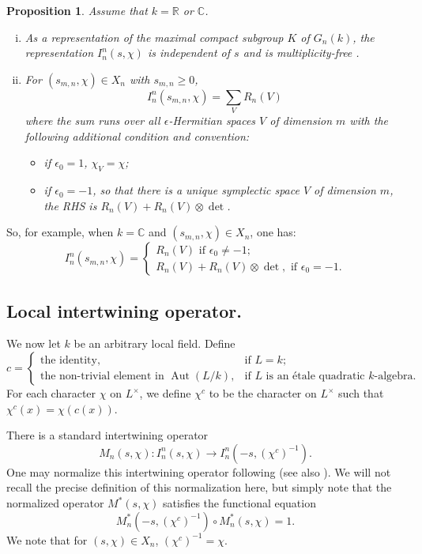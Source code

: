 \documentclass[10pt]{amsart}
\theoremstyle{plain}
\newtheorem{Prop}[equation]{Proposition}
\numberwithin{equation}{section}
\begin{document}
\begin{Prop} \label{P:arch1}
Assume that $k = {\mathbb{R}}$ or ${\mathbb C}$.
\begin{enumerate}[(i)]
\item As a representation of the maximal compact subgroup $K$ of
  $G_n(k)$, the representation $I^n_n(s,\chi)$ is independent of $s$
  and is multiplicity-free  .
\item For $(s_{m,n},\chi) \in X_n$ with $s_{m,n} \geq 0$, 
\[  I^n_n(s_{m,n}, \chi)  = \sum_V  R_n(V) \]
where the sum runs over all $\epsilon$-Hermitian spaces $V$ of
dimension $m$ with the following additional condition and  convention:
\begin{itemize}
 \item if $\epsilon_0 = 1$, $\chi_V = \chi$;
\item if $\epsilon_0 = -1$, so that there is a unique symplectic space
  $V$ of dimension $m$, the RHS is $R_n(V) + R_n(V) \otimes {\det}$. 
\end{itemize}
 \end{enumerate}
\end{Prop}
 So, for example, when $k = {\mathbb C}$ and $(s_{m,n}, \chi) \in X_n$, one has:
\[ 
 I^n_n(s_{m,n}, \chi)  = \begin{cases}
R_n(V) \text{  if $\epsilon_ 0 \ne -1$;} \\
R_n(V) + R_n(V) \otimes {\det}, \text{  if $\epsilon_0 =
  -1$.} \end{cases} 
\] 
 
 \vskip 5pt
 
  \subsection{\bf Local intertwining operator.}
 We now let $k$ be an arbitrary local field. Define 
\[
c=\begin{cases} \text{the identity},&\text{if $L=k$};\\
\text{the non-trivial element in } \operatorname{Aut}(L/k),&\text{if $L$ is an \'etale
  quadratic $k$-algebra.}
 \end{cases}
\]
For each character $\chi$
 on $L^\times$, we define $\chi^c$ to be the character on $L^\times$ such that
$\chi^c(x)=\chi(c(x))$. 

There is a standard intertwining operator 
 \[  
M_n(s,\chi):  I^n_n(s, \chi) \longrightarrow I^n_n(-s, (\chi^c)^{-1}).
\] 
One may normalize this intertwining operator following \cite{LR} (see also
\cite[\S 8]{GI2}). We will not recall the precise definition of this normalization
here, but simply note that the normalized operator $M^*(s, \chi)$
satisfies the functional equation
 \[  M^*_n( -s, (\chi^c)^{-1}) \circ M^*_n(s, \chi)  = 1. \]
 We note that for $(s, \chi) \in X_n$, $(\chi^c)^{-1} = \chi$.
 \vskip 5pt
 
\end{document}
